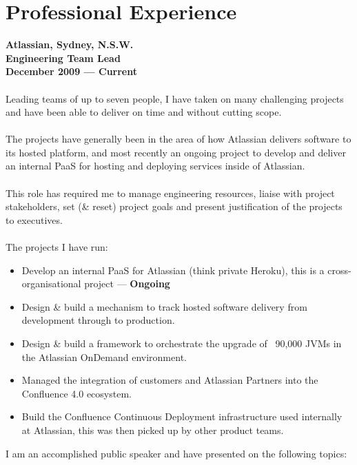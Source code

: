 \documentclass[a4paper]{article}
\begin{document}
\section*{Professional Experience}
\textbf{Atlassian, Sydney, N.S.W.\\Engineering Team Lead\\December 2009 --- Current}\\\\
Leading teams of up to seven people, I have taken on many challenging projects and have been able to deliver on time and without cutting scope.
\\\\The projects have generally been in the area of how Atlassian delivers software to its hosted platform, and most recently an ongoing project to develop and deliver an internal PaaS for hosting and deploying services inside of Atlassian.
\\\\
This role has required me to manage engineering resources, liaise with project stakeholders, set (\& reset) project goals and present justification of the projects to executives.
\\\\
The projects I have run:
\begin{itemize}
\item Develop an internal PaaS for Atlassian (think private Heroku), this is a cross-organisational project --- \textbf{Ongoing}
\item Design \& build a mechanism to track hosted software delivery from development through to production.
\item Design \& build a framework to orchestrate the upgrade of ~90,000 JVMs in the Atlassian OnDemand environment.
\item Managed the integration of customers and Atlassian Partners into the Confluence 4.0 ecosystem.
\item Build the Confluence Continuous Deployment infrastructure used internally at Atlassian, this was then picked up by other product teams.
\end{itemize}
I am an accomplished public speaker and have presented on the following topics:
\end{document}
